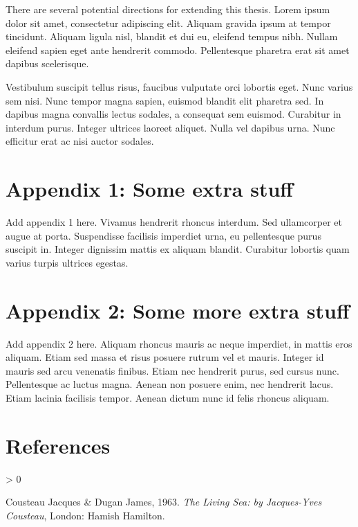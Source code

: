 \documentclass[12pt,a4paper,]{report}
\newlength{\cslhangindent}
\newenvironment{CSLReferences}[2] %
 {%
  \setlength{\parindent}{0pt}
  \ifodd #1 \everypar{\setlength{\hangindent}{\cslhangindent}}\ignorespaces\fi
  \ifnum #2 > 0
  \setlength{\parskip}{#2\baselineskip}
  \fi
 }%
 {}
\begin{document}
There are several potential directions for extending this thesis. Lorem
ipsum dolor sit amet, consectetur adipiscing elit. Aliquam gravida ipsum
at tempor tincidunt. Aliquam ligula nisl, blandit et dui eu, eleifend
tempus nibh. Nullam eleifend sapien eget ante hendrerit commodo.
Pellentesque pharetra erat sit amet dapibus scelerisque.

Vestibulum suscipit tellus risus, faucibus vulputate orci lobortis eget.
Nunc varius sem nisi. Nunc tempor magna sapien, euismod blandit elit
pharetra sed. In dapibus magna convallis lectus sodales, a consequat sem
euismod. Curabitur in interdum purus. Integer ultrices laoreet aliquet.
Nulla vel dapibus urna. Nunc efficitur erat ac nisi auctor sodales.

\hypertarget{appendix-1-some-extra-stuff}{%
\chapter*{Appendix 1: Some extra
stuff}\label{appendix-1-some-extra-stuff}}

Add appendix 1 here. Vivamus hendrerit rhoncus interdum. Sed ullamcorper
et augue at porta. Suspendisse facilisis imperdiet urna, eu pellentesque
purus suscipit in. Integer dignissim mattis ex aliquam blandit.
Curabitur lobortis quam varius turpis ultrices egestas.

\hypertarget{appendix-2-some-more-extra-stuff}{%
\chapter*{Appendix 2: Some more extra
stuff}\label{appendix-2-some-more-extra-stuff}}

Add appendix 2 here. Aliquam rhoncus mauris ac neque imperdiet, in
mattis eros aliquam. Etiam sed massa et risus posuere rutrum vel et
mauris. Integer id mauris sed arcu venenatis finibus. Etiam nec
hendrerit purus, sed cursus nunc. Pellentesque ac luctus magna. Aenean
non posuere enim, nec hendrerit lacus. Etiam lacinia facilisis tempor.
Aenean dictum nunc id felis rhoncus aliquam.

\footnotesize
\singlespacing
\setlength{\parindent}{0in}

\hypertarget{references}{%
\chapter*{References}\label{references}}

\hypertarget{refs}{}
\begin{CSLReferences}{1}{0}
\leavevmode\hypertarget{ref-Cousteau1963}{}%
Cousteau Jacques \& Dugan James, 1963. \emph{{The Living Sea: by
Jacques-Yves Cousteau}}, London: Hamish Hamilton.

\end{CSLReferences}
\end{document}
